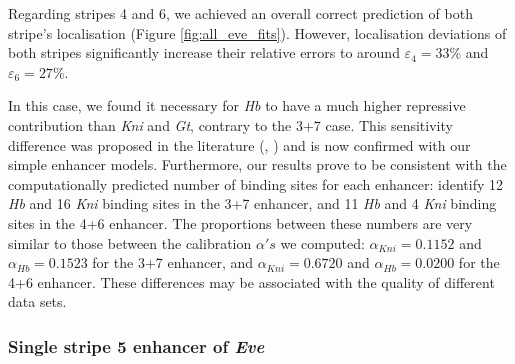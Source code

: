 \documentclass[final,authoryear, 5p, times]{elsarticle}
\begin{document}
Regarding stripes 4 and 6, we achieved an overall correct prediction of both stripe's localisation (Figure \ref{fig:all_eve_fits}). However, localisation deviations of both stripes significantly increase their relative errors to around $\varepsilon_4=33\%$ and $\varepsilon_6=27\%$.

In this case, we found it necessary for \textit{Hb} to have a much higher repressive contribution than \textit{Kni} and \textit{Gt}, contrary to the 3+7 case. This sensitivity difference was proposed in the literature (\cite{Clyde}, \cite{Crocker2016QuantitativelyPC}) and is now confirmed with our simple enhancer models. Furthermore, our results prove to be consistent with the computationally predicted number of binding sites for each enhancer: \cite{Clyde} identify 12 \textit{Hb} and 16 \textit{Kni} binding sites in the 3+7 enhancer, and 11 \textit{Hb} and 4 \textit{Kni} binding sites in the 4+6 enhancer. The proportions between these numbers are very similar to those between the calibration $\alpha's$ we computed: $\alpha_{Kni} = 0.1152$ and $\alpha_{Hb} = 0.1523$ for the 3+7 enhancer, and $\alpha_{Kni} = 0.6720$ and $\alpha_{Hb} = 0.0200$ for the 4+6 enhancer. These differences may be associated with the quality of different data sets.

\subsubsection{Single stripe 5 enhancer of \textit{Eve}}
\end{document}
